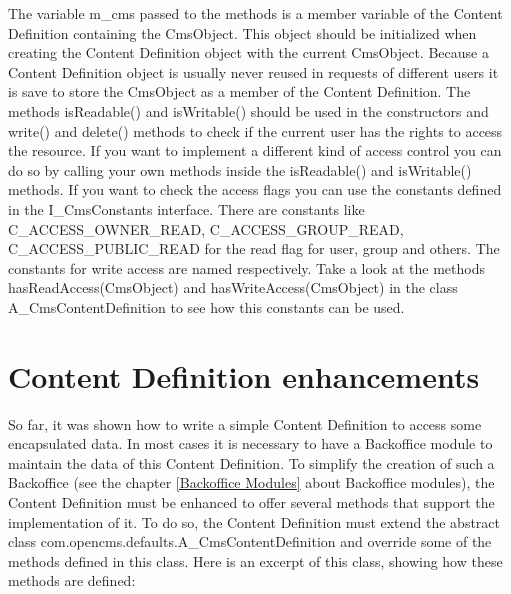 The variable m\_cms passed to the methods is a member variable of the
Content Definition containing the {\class CmsObject}. This object should
be initialized when creating the Content Definition object with the current
{\class CmsObject}. Because a Content Definition object is usually never reused in 
requests of different users it is save to store the {\class CmsObject} as a member
of the Content Definition. The methods {\meth isReadable()} and {\meth isWritable()}
should be used in the constructors and {\meth write()} and {\meth delete()} methods to check
if the current user has the rights to access the resource.
If you want to implement a different kind of access control
you can do so by calling your own methods inside the {\meth isReadable()}
and {\meth isWritable()} methods. If you want to check the access flags you can use
the constants defined in the {\class I\_CmsConstants} interface. There are constants
like  C\_ACCESS\_OWNER\_READ, C\-\_ACCESS\_GROUP\_READ, C\_ACCESS\_PUBLIC\_READ for the read flag for
user, group and others. The constants for write access are named respectively. Take a look
at the methods {\meth hasReadAccess(CmsObject)} and {\meth hasWriteAccess(CmsObject)}
in the class \\
{\class A\_CmsContentDefinition} to see how this constants can be used.

\section{Content Definition enhancements}
\label{enhancements}
So far, it was shown how to write a simple Content Definition to access
some encapsulated data. In most cases it is necessary to have a Backoffice 
module to maintain the data of this Content Definition. To
simplify the creation of such a Backoffice (see the chapter \ref{Backoffice Modules} about 
Backoffice modules), the Content Definition must be enhanced to offer
several methods that support the implementation of it. To do so, the
Content Definition must extend the abstract class {\class com.opencms.defaults.A\_CmsContentDefinition}
and override some of the methods defined in this class. Here is an excerpt of this
class, showing how these methods are defined:

